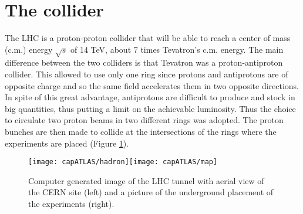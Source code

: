 \section{The collider}
The LHC is a proton-proton collider that will be able to reach a center of mass (c.m.) energy $\sqrt{s}$ of 14 TeV, about 7 times Tevatron's c.m. energy. The main difference between the two colliders is that Tevatron was a proton-antiproton collider. This allowed to use only one ring since protons and antiprotons are of opposite charge and so the same field accelerates them in two opposite directions. In spite of this great advantage, antiprotons are difficult to produce and stock in big quantities, thus putting a limit on the achievable luminosity. Thus the choice to circulate two proton beams in two different rings was adopted. The proton bunches are then made to collide at the intersections of the rings where the experiments are placed (Figure \ref{lhc}).
\begin{figure}[htb]\begin{center}
\texttt{[image: capATLAS/hadron]}\hspace{.01\textwidth}\texttt{[image: capATLAS/map]}\caption{Computer generated image of the LHC tunnel with aerial view of the CERN site (left) and a picture of the underground placement of the experiments (right).}\label{lhc}
\end{center}\end{figure}

